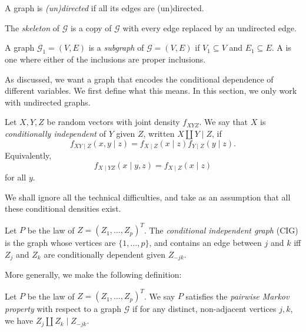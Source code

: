 \documentclass[a4paper]{article}
\begin{document}
\begin{defi}
  A graph is \emph{(un)directed} if all its edges are (un)directed.
\end{defi}

\begin{defi}[Skeleton]
  The \emph{skeleton} of $\mathcal{G}$ is a copy of $\mathcal{G}$ with every edge replaced by an undirected edge.
\end{defi}

\begin{defi}[Subgraph]
  A graph $\mathcal{G}_1 = (V, E)$ is a \emph{subgraph} of $\mathcal{G} = (V, E)$ if $V_1 \subseteq V$ and $E_1 \subseteq E$. A  is one where either of the inclusions are proper inclusions.
\end{defi}

As discussed, we want a graph that encodes the conditional dependence of different variables. We first define what this means. In this section, we only work with undirected graphs.

\begin{defi}
  Let $X, Y, Z$ be random vectors with joint density $f_{XYZ}$. We say that $X$ is \emph{conditionally independent} of $Y$ given $Z$, written $X \amalg Y \mid Z$, if
  \[
    f_{XY\mid Z}(x, y \mid z) = f_{X\mid Z}(x \mid z) f_{Y \mid Z} (y \mid z).
  \]
  Equivalently,
  \[
    f_{X\mid YZ} (x \mid y, z) = f_{X \mid Z}(x \mid z)
  \]
  for all $y$.
\end{defi}
We shall ignore all the technical difficulties, and take as an assumption that all these conditional densities exist.

\begin{defi}
  Let $P$ be the law of $Z = (Z_1, \ldots, Z_p)^T$. The \emph{conditional independent graph} (CIG) is the graph whose vertices are $\{1, \ldots, p\}$, and contains an edge between $j$ and $k$ iff $Z_j$ and $Z_k$ are conditionally dependent given $Z_{-jk}$.
\end{defi}

More generally, we make the following definition:
\begin{defi}
  Let $P$ be the law of $Z = (Z_1, \ldots, Z_p)^T$. We say $P$ satisfies the \emph{pairwise Markov property} with respect to a graph $\mathcal{G}$ if for any distinct, non-adjacent vertices $j, k$, we have $Z_j \amalg Z_k \mid Z_{-jk}$.
\end{defi}
\end{document}
